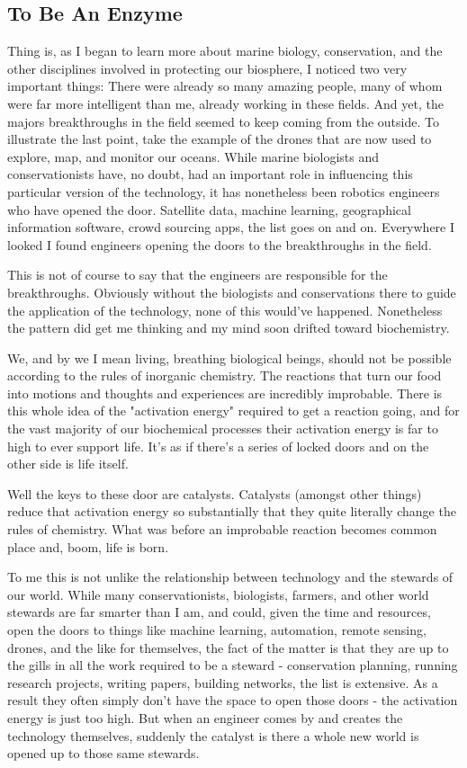 \documentclass[10pt,a5paper]{book}
\begin{document}
\subsection{To Be An Enzyme}
Thing is, as I began to learn more about marine biology, conservation, and the other disciplines involved in protecting our biosphere, I noticed two very important things:
There were already so many amazing people, many of whom were far more intelligent than me, already working in these fields.
And yet, the majors breakthroughs in the field seemed to keep coming from the outside.
To illustrate the last point, take the example of the drones that are now used to explore, map, and monitor our oceans. While marine biologists and conservationists have, no doubt, had an important role in influencing this particular version of the technology, it has nonetheless been robotics engineers who have opened the door. Satellite data, machine learning, geographical information software, crowd sourcing apps, the list goes on and on. Everywhere I looked I found engineers opening the doors to the breakthroughs in the field. 

This is not of course to say that the engineers are responsible for the breakthroughs. Obviously without the biologists and conservations there to guide the application of the technology, none of this would've happened. Nonetheless the pattern did get me thinking and my mind soon drifted toward biochemistry.

We, and by we I mean living, breathing biological beings, should not be possible according to the rules of inorganic chemistry. The reactions that turn our food into motions and thoughts and experiences are incredibly improbable. There is this whole idea of the "activation energy" required to get a reaction going, and for the vast majority of our biochemical processes their activation energy is far to high to ever support life. It's as if there's a series of locked doors and on the other side is life itself. 

Well the keys to these door are catalysts. Catalysts (amongst other things) reduce that activation energy so substantially that they quite literally change the rules of chemistry. What was before an improbable reaction becomes common place and, boom, life is born.

To me this is not unlike the relationship between technology and the stewards of our world. While many conservationists, biologists, farmers, and other world stewards are far smarter than I am, and could, given the time and resources, open the doors to things like machine learning, automation, remote sensing, drones, and the like for themselves, the fact of the matter is that they are up to the gills in all the work required to be a steward - conservation planning, running research projects, writing papers, building networks, the list is extensive. As a result they often simply don't have the space to open those doors - the activation energy is just too high. But when an engineer comes by and creates the technology themselves, suddenly the catalyst is there a whole new world is opened up to those same stewards. 
\end{document}
